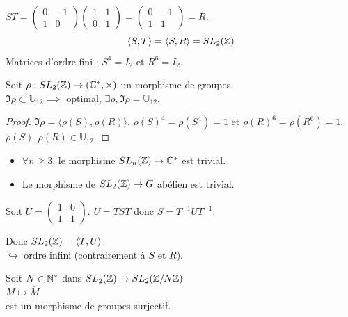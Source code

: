 \begin{remarque}
    $ST = \begin{pmatrix} 0 & -1 \\ 1 & 0 \end{pmatrix} \begin{pmatrix} 1 & 1 \\ 0 & 1 \end{pmatrix} = \begin{pmatrix} 0 & -1 \\ 1 & 1 \end{pmatrix} = R$.
    \[ \langle S, T \rangle = \langle S, R \rangle = SL_2(\mathbb{Z}) \]
    Matrices d'ordre fini : $S^4 = I_2$ et $R^6 = I_2$.
\end{remarque}

Soit $\rho : SL_2(\mathbb{Z}) \to (\mathbb{C}^*, \times)$ un morphisme de groupes. \\
 $\Im \rho \subset \mathbb{U}_{12} \implies$ optimal, $\exists \rho, \Im \rho = \mathbb{U}_{12}$.

\begin{proof}
    $\Im \rho = \langle \rho(S), \rho(R) \rangle$. $\rho(S)^4 = \rho(S^4) = 1$ et $\rho(R)^6 = \rho(R^6) = 1$. \\
    $\rho(S), \rho(R) \in \mathbb{U}_{12}$.
\end{proof}

\begin{itemize}
    \item $\forall n \geqslant 3$, le morphisme $SL_n(\mathbb{Z}) \to \mathbb{C}^*$ est trivial.
    \item Le morphisme de $SL_2(\mathbb{Z}) \to G$ abélien est trivial.
\end{itemize}

Soit $U = \begin{pmatrix} 1 & 0 \\ 1 & 1 \end{pmatrix}$. $U = TST$ donc $S = T^{-1} U T^{-1}$.

Donc $SL_2(\mathbb{Z}) = \langle T, U \rangle$. \\
$\hookrightarrow$ ordre infini (contrairement à $S$ et $R$).

\begin{theoreme}{}{}
    Soit $N \in \mathbb{N}^*$ dans $SL_2(\mathbb{Z}) \to SL_2(\mathbb{Z}/N\mathbb{Z})$ \\
    $M \mapsto \overline{M}$ \\
    est un morphisme de groupes surjectif.
\end{theoreme}


